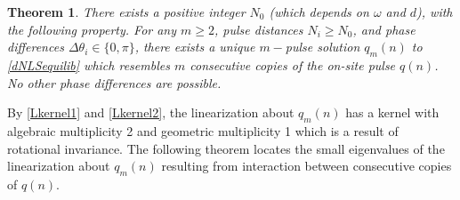 \documentclass[12pt]{article}
\newtheorem{theorem}{Theorem}
\begin{document}
\begin{theorem}\label{dNLSexisttheorem}
There exists a positive integer $N_0$ (which depends on $\omega$ and $d$), with the following property. For any $m \geq 2$, pulse distances $N_i \geq N_0$, and phase differences $\Delta\theta_i \in \{0, \pi\}$, there exists a unique $m-$pulse solution $q_m(n)$ to \eqref{dNLSequilib} which resembles $m$ consecutive copies of the on-site pulse $q(n)$. No other phase differences are possible.
\end{theorem}

By \eqref{Lkernel1} and \eqref{Lkernel2}, the linearization about $q_m(n)$ has a kernel with algebraic multiplicity 2 and geometric multiplicity 1 which is a result of rotational invariance. The following theorem locates the small eigenvalues of the linearization about $q_m(n)$ resulting from interaction between consecutive copies of $q(n)$. 
\end{document}
